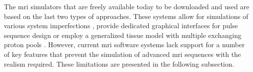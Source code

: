 \hfill

The \ac{mri} simulators that are freely available today to be downloaded and used are based on the last two types of approaches.
These systems allow for simulations of various system imperfections \cite{Drobnjak2006}, 
provide dedicated graphical interfaces for pulse sequence design \cite{Stocker2010} \cite{Jochimsen2004} \cite{Overall2007}
or
employ a generalized tissue model with multiple exchanging proton pools \cite{Liu2017}.
However, current \ac{mri} software systems lack support for a number of key features that prevent the simulation of advanced \ac{mri} sequences with the realism required.
These limitations are presented in the following subsection.



    
    


